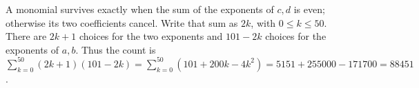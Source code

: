 A monomial survives exactly when the sum of the exponents of $c,d$ is even; otherwise its two coefficients cancel. Write that sum as $2k$, with $0\le k\le50$. There are $2k+1$ choices for the two exponents and $101-2k$ choices for the exponents of $a,b$. Thus the count is $\sum_{k=0}^{50}(2k+1)(101-2k)=\sum_{k=0}^{50}(101+200k-4k^2)=5151+255000-171700=\boxed{88451}$.
